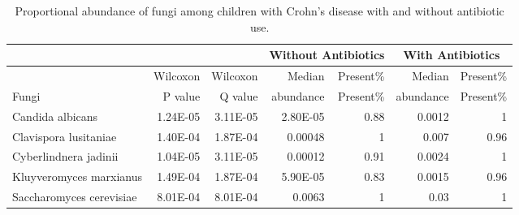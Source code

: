 {\footnotesize
	\renewcommand{\arraystretch}{0.7} \setlength{\tabcolsep}{3pt}
	\begin{longtable}{ | l | r | r | r | r | r | r  | }
		\caption[Proportional abundance of fungi among children with Crohn’s disease  with and without antibiotic use]{Proportional abundance of fungi among children with Crohn’s disease  with and without antibiotic use.} 
		\label{TS12} \\
		
		\hline
		\multicolumn{3}{|c|}{} & \multicolumn{2}{c}{Without Antibiotics}
		& \multicolumn{2}{|c|}{With Antibiotics}\\
		\hline 
		& Wilcoxon & Wilcoxon & Median  & Present\% & Median  & Present\% \\ 
		Fungi &  P value & Q value &  abundance & Present\% &  abundance & Present\% \\ 
			\hline 
		\endfirsthead
		
		
		\endfoot
		
		\hline 
		\endlastfoot
		
		
		
		Candida albicans & 1.24E-05 & 3.11E-05 & 2.80E-05 & 0.88 & 0.0012 & 1 \\ 
		Clavispora lusitaniae & 1.40E-04 & 1.87E-04 & 0.00048 & 1 & 0.007 & 0.96 \\ 
		Cyberlindnera jadinii & 1.04E-05 & 3.11E-05 & 0.00012 & 0.91 & 0.0024 & 1 \\ 
		Kluyveromyces marxianus & 1.49E-04 & 1.87E-04 & 5.90E-05 & 0.83 & 0.0015 & 0.96 \\ 
		Saccharomyces cerevisiae & 8.01E-04 & 8.01E-04 & 0.0063 & 1 & 0.03 & 1
		
	\end{longtable}
}




